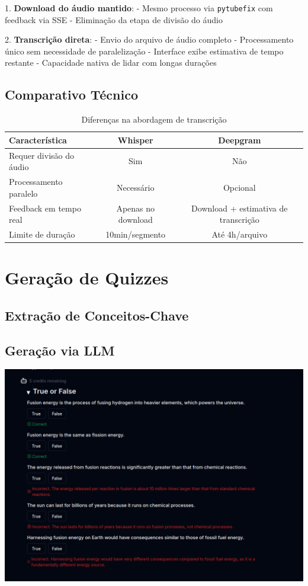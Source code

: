 \documentclass[tcc,capa]{texufpel}
\begin{document}
1. \textbf{Download do áudio mantido}:
   - Mesmo processo via \texttt{pytubefix} com feedback via SSE
   - Eliminação da etapa de divisão do áudio

2. \textbf{Transcrição direta}:
   - Envio do arquivo de áudio completo
   - Processamento único sem necessidade de paralelização
   - Interface exibe estimativa de tempo restante
   - Capacidade nativa de lidar com longas durações

\subsection{Comparativo Técnico}

\begin{table}[h]
\centering
\begin{tabular}{|l|c|c|}
\hline
\textbf{Característica} & \textbf{Whisper} & \textbf{Deepgram} \\ \hline
Requer divisão do áudio & Sim & Não \\ \hline
Processamento paralelo & Necessário & Opcional \\ \hline
Feedback em tempo real & Apenas no download & Download + estimativa de transcrição \\ \hline
Limite de duração & 10min/segmento & Até 4h/arquivo \\ \hline
\end{tabular}
\caption{Diferenças na abordagem de transcrição}
\label{tab:abordagem}
\end{table}




\section{Geração de Quizzes}
\subsection{Extração de Conceitos-Chave}
\subsection{Geração via LLM}

\includegraphics[width=\textwidth,height=\textheight,keepaspectratio]{exemplo-slides/graphics/images/true or false.png}
\end{document}
